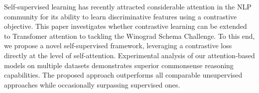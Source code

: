 Self-supervised learning has recently attracted considerable attention in the NLP community for its ability to learn discriminative features using a contrastive objective. This paper investigates whether contrastive learning can be extended to Transfomer attention to tackling the Winograd Schema Challenge. To this end, we propose a novel self-supervised framework, leveraging a contrastive loss directly at the level of self-attention. Experimental analysis of our attention-based models on multiple datasets demonstrates superior commonsense reasoning capabilities. The proposed approach outperforms all comparable unsupervised approaches while occasionally surpassing supervised ones.
